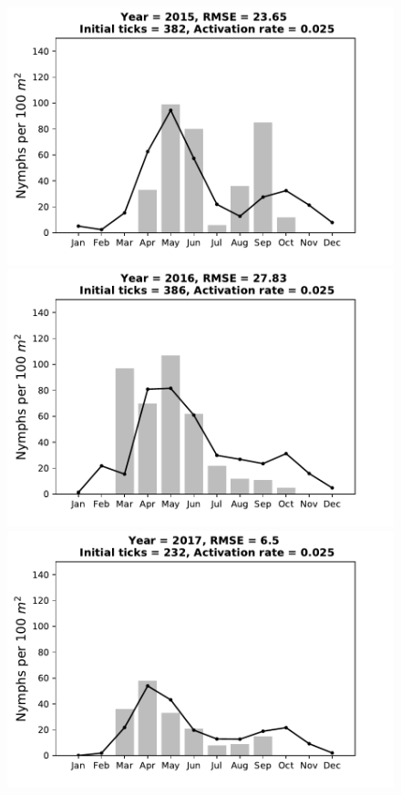 \documentclass[a4paper, 11pt]{scrartcl}
\begin{document}
\begin{figure}[h!]
\begin{minipage}[c]{0.40\linewidth}
\end{minipage}
\begin{minipage}[c]{0.40\linewidth}
\includegraphics[width=\linewidth]{figures/s2/S2_2015}
\end{minipage}
\begin{minipage}[c]{0.40\linewidth}
\includegraphics[width=\linewidth]{figures/s2/S2_2016}
\end{minipage}
\begin{minipage}[c]{0.40\linewidth}
\includegraphics[width=\linewidth]{figures/s2/S2_2017}

\end{minipage}
\end{figure}
\end{document}
